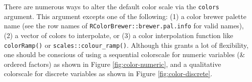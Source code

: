 \documentclass[
  12pt,
]{krantz}
\newenvironment{Shaded}{\begin{snugshade}}{\end{snugshade}}
\newcommand{\DataTypeTok}[1]{\textcolor[rgb]{0.13,0.29,0.53}{#1}}
\newcommand{\DecValTok}[1]{\textcolor[rgb]{0.00,0.00,0.81}{#1}}
\newcommand{\KeywordTok}[1]{\textcolor[rgb]{0.13,0.29,0.53}{\textbf{#1}}}
\newcommand{\NormalTok}[1]{#1}
\newcommand{\OperatorTok}[1]{\textcolor[rgb]{0.81,0.36,0.00}{\textbf{#1}}}
\newcommand{\StringTok}[1]{\textcolor[rgb]{0.31,0.60,0.02}{#1}}
\begin{document}
There are numerous ways to alter the default color scale via the \texttt{colors} argument. This argument excepts one of the following: (1) a color brewer palette name (see the row names of \texttt{RColorBrewer::brewer.pal.info} for valid names), (2) a vector of colors to interpolate, or (3) a color interpolation function like \texttt{colorRamp()} or \texttt{scales::colour\_ramp()}. Although this grants a lot of flexibility, one should be conscious of using a sequential colorscale for numeric variables (\& ordered factors) as shown in Figure \ref{fig:color-numeric}, and a qualitative colorscale for discrete variables as shown in Figure \ref{fig:color-discrete}.

\begin{Shaded}
\end{Shaded}
\end{document}
